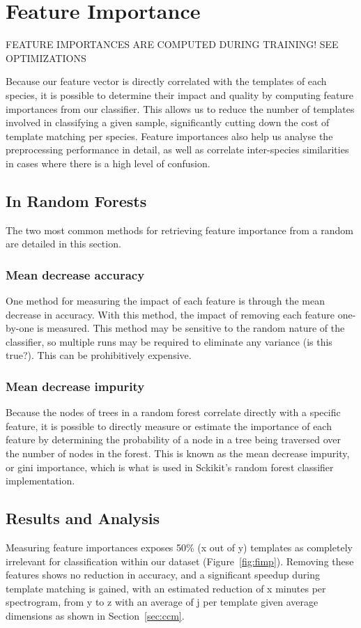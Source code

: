 \section{Feature Importance}\label{sec:feature_imp}

FEATURE IMPORTANCES ARE COMPUTED DURING TRAINING! SEE OPTIMIZATIONS

Because our feature vector is directly correlated with the templates of each species,
it is possible to determine their impact and quality by computing feature
importances from our classifier.
This allows us to reduce the number of templates involved in classifying a given
sample, significantly cutting down the cost of template matching per species.
Feature importances also help us analyse the preprocessing performance in detail,
as well as correlate inter-species similarities in cases where there is a high
level of confusion.

\subsection{In Random Forests}

The two most common methods for retrieving feature importance from a random
are detailed in this section.

\subsubsection{Mean decrease accuracy}
One method for measuring the impact of each feature is through the mean decrease
in accuracy.
With this method, the impact of removing each feature one-by-one is measured.
This method may be sensitive to the random nature of the classifier, so multiple
runs may be required to eliminate any variance (is this true?).
This can be prohibitively expensive.

\subsubsection{Mean decrease impurity}
Because the nodes of trees in a random forest correlate directly with a specific
feature, it is possible to directly measure or estimate the importance of each
feature by determining the probability of a node in a tree being traversed over 
the number of nodes in the forest.
This is known as the mean decrease impurity, or gini importance, which is what
is used in Sckikit's random forest classifier implementation.

\subsection{Results and Analysis}
Measuring feature importances exposes 50\% (x out of y) templates as 
completely irrelevant for classification within our dataset
(Figure~\ref{fig:fimp}).
Removing these features shows no reduction in accuracy, and a significant speedup
during template matching is gained, with an estimated reduction of x minutes per
spectrogram, from y to z with an average of j per template given average
dimensions as shown in Section~\ref{sec:ccm}.

